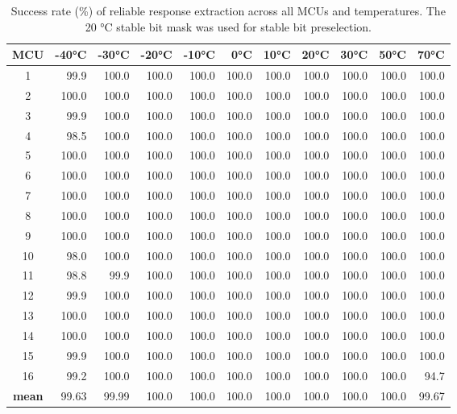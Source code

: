 \begin{table}[ht!]
    \centering
    \begin{tabular}{c||rrrrrrrrrr}
    \toprule
    \textbf{MCU} & \textbf{-40°C} & \textbf{-30°C} & \textbf{-20°C} & \textbf{-10°C} & \textbf{0°C} & \textbf{10°C} & \textbf{20°C} & \textbf{30°C} & \textbf{50°C} & \textbf{70°C} \\
    \midrule
    1    &  99.9 & 100.0 & 100.0 & 100.0 & 100.0 & 100.0 & 100.0 & 100.0 & 100.0 & 100.0 \\
    2    & 100.0 & 100.0 & 100.0 & 100.0 & 100.0 & 100.0 & 100.0 & 100.0 & 100.0 & 100.0 \\
    3    &  99.9 & 100.0 & 100.0 & 100.0 & 100.0 & 100.0 & 100.0 & 100.0 & 100.0 & 100.0 \\
    4    &  98.5 & 100.0 & 100.0 & 100.0 & 100.0 & 100.0 & 100.0 & 100.0 & 100.0 & 100.0 \\
    5    & 100.0 & 100.0 & 100.0 & 100.0 & 100.0 & 100.0 & 100.0 & 100.0 & 100.0 & 100.0 \\
    6    & 100.0 & 100.0 & 100.0 & 100.0 & 100.0 & 100.0 & 100.0 & 100.0 & 100.0 & 100.0 \\
    7    & 100.0 & 100.0 & 100.0 & 100.0 & 100.0 & 100.0 & 100.0 & 100.0 & 100.0 & 100.0 \\
    8    & 100.0 & 100.0 & 100.0 & 100.0 & 100.0 & 100.0 & 100.0 & 100.0 & 100.0 & 100.0 \\
    9    & 100.0 & 100.0 & 100.0 & 100.0 & 100.0 & 100.0 & 100.0 & 100.0 & 100.0 & 100.0 \\
    10   &  98.0 & 100.0 & 100.0 & 100.0 & 100.0 & 100.0 & 100.0 & 100.0 & 100.0 & 100.0 \\
    11   &  98.8 &  99.9 & 100.0 & 100.0 & 100.0 & 100.0 & 100.0 & 100.0 & 100.0 & 100.0 \\
    12   &  99.9 & 100.0 & 100.0 & 100.0 & 100.0 & 100.0 & 100.0 & 100.0 & 100.0 & 100.0 \\
    13   & 100.0 & 100.0 & 100.0 & 100.0 & 100.0 & 100.0 & 100.0 & 100.0 & 100.0 & 100.0 \\
    14   & 100.0 & 100.0 & 100.0 & 100.0 & 100.0 & 100.0 & 100.0 & 100.0 & 100.0 & 100.0 \\
    15   &  99.9 & 100.0 & 100.0 & 100.0 & 100.0 & 100.0 & 100.0 & 100.0 & 100.0 & 100.0 \\
    16   &  99.2 & 100.0 & 100.0 & 100.0 & 100.0 & 100.0 & 100.0 & 100.0 & 100.0 &  94.7 \\
    \textbf{mean} &  99.63 &  99.99 & 100.0 & 100.0 & 100.0 & 100.0 & 100.0 & 100.0 & 100.0 &  99.67 \\
    \bottomrule
\end{tabular}
    \captionsetup{justification=centering,margin=0.5cm}
    \caption[Success rate of reliable response extraction across all MCUs and temperatures]{Success rate (\%) of reliable response extraction across all MCUs and temperatures. The 20 °C stable bit mask was used for stable bit preselection.}
    \label{table:reconstruction_reliability}
    \vspace{-1.5em}
\end{table}

